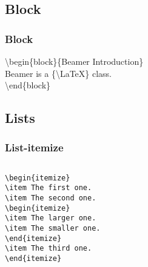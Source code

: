 \documentclass[article]{beamer}
\begin{document}
\subsection{Block}
\begin{frame}
\frametitle{Block}

\alert{\textbackslash begin\{block\}}\{Beamer Introduction\}\\
Beamer is a \{\textbackslash LaTeX\} class.\\
\alert{\textbackslash end\{block\}}\\
\vspace{1cm}
\vspace{1cm}
\end{frame}



\subsection{Lists}
\begin{frame}[fragile]
\frametitle{List-itemize}

\begin{columns}
\begin{block}
\scriptsize{
\begin{verbatim}
\begin{itemize}
\item The first one.
\item The second one.
\begin{itemize}
\item The larger one.
\item The smaller one.
\end{itemize}
\item The third one.
\end{itemize}
\end{verbatim}
}
\end{block}
\end{columns}

\end{frame}
\end{document}
